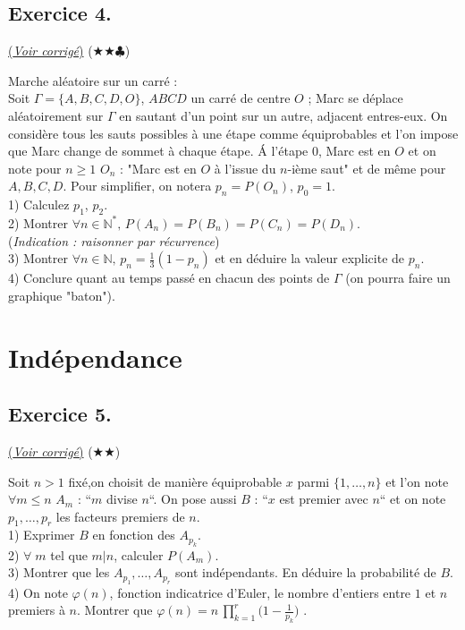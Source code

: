 \documentclass{article}
\newcommand{\N}{\mathbb{N}}
\newcommand{\0}{\emptyset}
\begin{document}
\subsection*{Exercice 4.}
\hyperref[subsec:corr4]{(\textit{Voir corrigé})}
($\bigstar\bigstar\clubsuit$)
\label{subsec:ex4}
\begin{flushleft}
Marche aléatoire sur un carré :\\
Soit $\Gamma = \{A,B,C,D,O\}$, $ABCD$ un carré de centre $O$ ; Marc se déplace aléatoirement sur $\Gamma$ en sautant d'un point sur un autre, adjacent entres-eux. On considère tous les sauts possibles à une étape comme équiprobables et l'on impose que Marc change de sommet à chaque étape. Á l'étape 0, Marc est en $O$ et on note pour $n\geqslant1$ $O_n$ : "Marc est en $O$ à l'issue du $n$-ième saut" et de même pour $A,B,C,D$. Pour simplifier, on notera $p_n=P(O_n)$, $p_0=1$.\\
1) Calculez $p_1$, $p_2$.\\
2) Montrer $\forall n\in\N^*,\, P(A_n)=P(B_n)=P(C_n)=P(D_n)$.\\
(\textit{Indication : raisonner par récurrence})\\
3) Montrer $\forall n\in\N,\, p_n = \frac{1}{3}(1-p_n)$ et en déduire la valeur explicite de $p_n$.\\
4) Conclure quant au temps passé en chacun des points de $\Gamma$ (on pourra faire un graphique "baton").\\

\end{flushleft}


\section*{Indépendance}
\subsection*{Exercice 5.}
\hyperref[subsec:corr5]{(\textit{Voir corrigé})}
($\bigstar\bigstar$)
\label{subsec:ex5}
\begin{flushleft}
Soit $n>1$ fixé,on choisit de manière équiprobable $x$ parmi $\{1,\dots,n\}$ et l'on note $\forall m\leqslant n$ $A_m$ : “$m$ divise $n$“. On pose aussi $B$ : “$x$ est premier avec $n$“ et on note $p_1,\dots,p_r$ les facteurs premiers de $n$.\\
1) Exprimer $B$ en fonction des $A_{p_k}$.\\
2) $\forall\; m$ tel que $m|n$, calculer $P(A_m)$.\\
3) Montrer que les $A_{p_1},\dots,A_{p_r}$ sont indépendants. En déduire la probabilité de $B$.\\
4) On note $\varphi(n)$, fonction indicatrice d'Euler, le nombre d'entiers entre $1$ et $n$ premiers à $n$. Montrer que $\varphi(n)=n\,\prod_{k=1}^r \Big(1 - \frac{1}{p_k}\Big)$ .\\

\end{flushleft}
\end{document}
